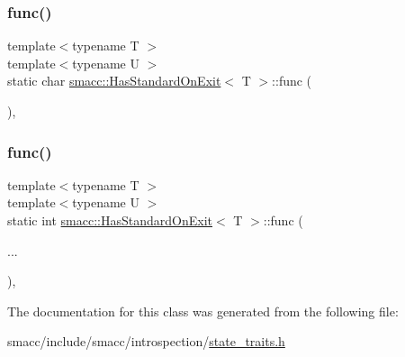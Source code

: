 \subsubsection{\texorpdfstring{func()}{func()}\hspace{0.1cm}{\footnotesize\ttfamily [1/2]}}
{\footnotesize\ttfamily template$<$typename T $>$ \\
template$<$typename U $>$ \\
static char \hyperlink{classsmacc_1_1HasStandardOnExit}{smacc\+::\+Has\+Standard\+On\+Exit}$<$ T $>$\+::func (\begin{DoxyParamCaption}\item[{\hyperlink{structsmacc_1_1HasStandardOnExit_1_1Check}{Check}$<$ U, \&U\+::on\+Exit $>$ $\ast$}]{ }\end{DoxyParamCaption})\hspace{0.3cm}{\ttfamily [static]}, {\ttfamily [private]}}

\mbox{\label{classsmacc_1_1HasStandardOnExit_a36115df0cabb66bfa5c7d4f08a8222eb}} 
\subsubsection{\texorpdfstring{func()}{func()}\hspace{0.1cm}{\footnotesize\ttfamily [2/2]}}
{\footnotesize\ttfamily template$<$typename T $>$ \\
template$<$typename U $>$ \\
static int \hyperlink{classsmacc_1_1HasStandardOnExit}{smacc\+::\+Has\+Standard\+On\+Exit}$<$ T $>$\+::func (\begin{DoxyParamCaption}\item[{}]{... }\end{DoxyParamCaption})\hspace{0.3cm}{\ttfamily [static]}, {\ttfamily [private]}}



The documentation for this class was generated from the following file\+:\begin{DoxyCompactItemize}
\item 
smacc/include/smacc/introspection/\hyperlink{state__traits_8h}{state\+\_\+traits.\+h}\end{DoxyCompactItemize}
